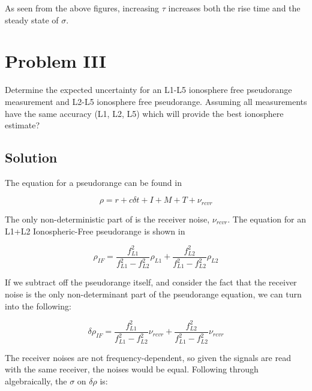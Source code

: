 \documentclass{article}
\begin{document}
As seen from the above figures, increasing $\tau$ increases both the rise time and the steady state of $\sigma$.

\section*{Problem III}
Determine the expected uncertainty for an L1-L5 ionosphere free pseudorange measurement
and L2-L5 ionosphere free pseudorange. Assuming all measurements have the same
accuracy (L1, L2, L5) which will provide the best ionosphere estimate?
\subsection*{Solution}
The equation for a pseudorange can be found in 

\begin{equation}
    \rho = r + c\delta t + I + M + T + \nu_{rcvr}\label{eq:pseudorange}
\end{equation}

The only non-deterministic part of  is the receiver noise, $\nu_{rcvr}$.  The equation for an L1+L2 Ionospheric-Free pseudorange is shown in 

\begin{equation}
    \rho_{IF} = \frac{f_{L1}^2}{f_{L1}^2 - f_{L2}^2}\rho_{L1} + \frac{f_{L2}^2}{f_{L1}^2 - f_{L2}^2}\rho_{L2}\label{eq:IF_pseudorange}
\end{equation}

If we subtract off the pseudorange itself, and consider the fact that the receiver noise is the only non-determinant part of the pseudorange equation, we can turn  into the following:

\begin{equation}
    \delta \rho_{IF} = \frac{f_{L1}^2}{f_{L1}^2 - f_{L2}^2}\nu_{rcvr} + \frac{f_{L2}^2}{f_{L1}^2 - f_{L2}^2}\nu_{rcvr}\label{eq:IF_del_psr}
\end{equation}

The receiver noises are not frequency-dependent, so given the signals are read with the same receiver, the noises would be equal.  Following  through algebraically, the $\sigma$ on $\delta \rho$ is:
\end{document}
